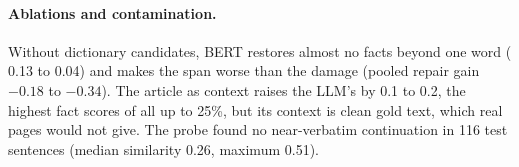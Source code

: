 \paragraph{Ablations and contamination.} Without dictionary candidates, BERT restores almost no facts beyond one word
(\frr{} 0.13 to 0.04) and makes the span worse than the damage (pooled repair gain $-0.18$ to $-0.34$). The article
as context raises the LLM's \frr{} by 0.1 to 0.2, the highest fact scores of all up to 25\%, but its context is clean gold
text, which real pages would not give. The probe found no near-verbatim continuation in 116 test sentences (median similarity
0.26, maximum 0.51).

